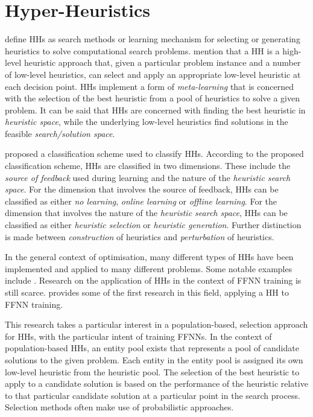 \documentclass[preprint,review,12pt]{elsarticle}
\begin{document}
\section{Hyper-Heuristics}
\label{sec:hhs}

\citet{ref:burke:2010} define \acp{HH} as search methods or learning mechanism for selecting or generating heuristics to solve computational search problems. \citet{ref:burke:2003} mention that a \acs{HH} is a high-level heuristic approach that, given a particular problem instance and a number of low-level heuristics, can select and apply an appropriate low-level heuristic at each decision point. \acp{HH} implement a form of \textit{meta-learning} that is concerned with the selection of the best heuristic from a pool of heuristics to solve a given problem. It can be said that \acp{HH} are concerned with finding the best heuristic in \textit{heuristic space}, while the underlying low-level heuristics find solutions in the feasible \textit{search/solution space}.

\citet{ref:burke:2010} proposed a classification scheme used to classify \acp{HH}. According to the proposed classification scheme, \acp{HH} are classified in two dimensions. These include the \textit{source of feedback} used during learning and the nature of the \textit{heuristic search space}. For the dimension that involves the source of feedback, \acp{HH} can be classified as either \textit{no learning}, \textit{online learning} or \textit{offline learning}. For the dimension that involves the nature of the \textit{heuristic search space}, \acp{HH} can be classified as either \textit{heuristic selection} or \textit{heuristic generation}. Further distinction is made between \textit{construction} of heuristics and \textit{perturbation} of heuristics.

In the general context of optimisation, many different types of \acp{HH} have been implemented and applied to many different problems. Some notable examples include \citep{ref:dowsland:2007, ref:burke:2010, ref:grobler:2012, ref:vanderstockt:2018}. Research on the application of \acp{HH} in the context of \acs{FFNN} training is still scarce. \citet{ref:nel:2021} provides some of the first research in this field, applying a \acs{HH} to \acs{FFNN} training.

This research takes a particular interest in a population-based, selection approach for \acp{HH}, with the particular intent of training \acp{FFNN}. In the context of population-based \acp{HH}, an entity pool exists that represents a pool of candidate solutions to the given problem. Each entity in the entity pool is assigned its own low-level heuristic from the heuristic pool. The selection of the best heuristic to apply to a candidate solution is based on the performance of the heuristic relative to that particular candidate solution at a particular point in the search process. Selection methods often make use of probabilistic approaches.
\end{document}
